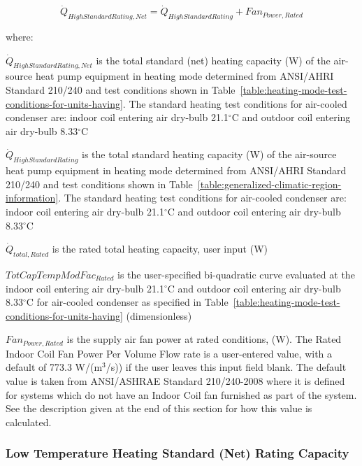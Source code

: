 \begin{equation}
{\dot Q_{HighStandardRating,Net}} = {\dot Q_{HighStandardRating}} + Fa{n_{Power,Rated}}
\end{equation}

where:

\({\dot Q_{HighStandardRating,Net}}\) is the total standard (net) heating capacity (W) of the air-source heat pump equipment in heating mode determined from ANSI/AHRI Standard 210/240 and test conditions shown in Table~\ref{table:heating-mode-test-conditions-for-units-having}. The standard heating test conditions for air-cooled condenser are: indoor coil entering air dry-bulb 21.1\(^{\circ}\)C and outdoor coil entering air dry-bulb 8.33\(^{\circ}\)C

\({\dot Q_{HighStandardRating}}\) is the total standard heating capacity (W) of the air-source heat pump equipment in heating mode determined from ANSI/AHRI Standard 210/240 and test conditions shown in Table~\ref{table:generalized-climatic-region-information}. The standard heating test conditions for air-cooled condenser are: indoor coil entering air dry-bulb 21.1\(^{\circ}\)C and outdoor coil entering air dry-bulb 8.33\(^{\circ}\)C

\({\dot Q_{total,Rated}}\) is the rated total heating capacity, user input (W)

\(TotCapTempModFa{c_{Rated}}\) is the user-specified bi-quadratic curve evaluated at the indoor coil entering air dry-bulb 21.1\(^{\circ}\)C and outdoor coil entering air dry-bulb 8.33\(^{\circ}\)C for air-cooled condenser as specified in Table~\ref{table:heating-mode-test-conditions-for-units-having} (dimensionless)

\(Fa{n_{Power,Rated}}\) is the supply air fan power at rated conditions, (W). The Rated Indoor Coil Fan Power Per Volume Flow rate is a user-entered value, with a default of 773.3 W/(m\(^3\)/s)) if the user leaves this input field blank. The default value is taken from ANSI/ASHRAE Standard 210/240-2008 where it is defined for systems which do not have an Indoor Coil fan furnished as part of the system. See the description given at the end of this section for how this value is calculated.

\subsubsection{Low Temperature Heating Standard (Net) Rating Capacity}\label{low-temperature-heating-standard-net-rating-capacity}

